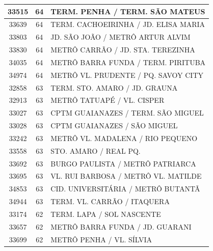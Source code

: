 \documentclass[
	12pt,				%
	oneside,			%
	a4paper,			%
	english,			%
	brazil				%
	]{abntex2ppgsi}
\begin{document}
\begin{apendicesenv}
\begin{longtable}{c|c|p{7cm}}
    33515 & 64    & TERM. PENHA / TERM. SÃO MATEUS \\
\hline

    33639 & 64    & TERM. CACHOEIRINHA / JD. ELISA MARIA \\
\hline

    33803 & 64    & JD. SÃO JOÃO  / METRÔ ARTUR ALVIM \\
\hline

    33830 & 64    & METRÔ CARRÃO / JD. STA. TEREZINHA \\
\hline

    34035 & 64    & METRÔ BARRA FUNDA / TERM. PIRITUBA \\
\hline

    34974 & 64    & METRÔ VL. PRUDENTE / PQ. SAVOY CITY \\
\hline

    32858 & 63    & TERM. STO. AMARO / JD. GRAUNA \\
\hline

    32913 & 63    & METRÔ TATUAPÉ / VL. CISPER \\
\hline

    33027 & 63    & CPTM GUAIANAZES / TERM. SÃO MIGUEL \\
\hline

    33028 & 63    & CPTM GUAIANAZES / SÃO MIGUEL \\
\hline

    33242 & 63    & METRÔ VL. MADALENA / RIO PEQUENO \\
\hline

    33558 & 63    & STO. AMARO / REAL PQ. \\
\hline

    33692 & 63    & BURGO PAULISTA / METRÔ PATRIARCA \\
\hline

    33695 & 63    & VL. RUI BARBOSA / METRÔ VL. MATILDE \\
\hline

    34853 & 63    & CID. UNIVERSITÁRIA / METRÔ BUTANTÃ \\
\hline

    34944 & 63    & TERM. VL. CARRÃO / ITAQUERA \\
\hline

    33174 & 62    & TERM. LAPA / SOL NASCENTE \\
\hline

    33657 & 62    & METRÔ BARRA FUNDA / JD. GUARANI \\
\hline

    33699 & 62    & METRÔ PENHA / VL. SÍLVIA \\
\hline


\end{longtable}
\end{apendicesenv}
\end{document}
